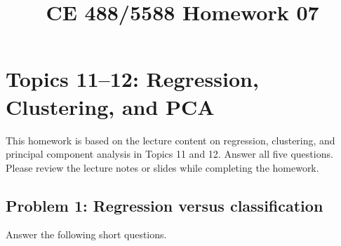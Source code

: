 \documentclass[12pt]{article}
\begin{document}
\title{CE 488/5588 Homework 07\\
\vspace{2in}
\author{}
}
\maketitle
\newpage

\section*{Topics 11--12: Regression, Clustering, and PCA}

\begin{ch-box}
This homework is based on the lecture content on regression, clustering, and principal
component analysis in Topics 11 and 12. Answer all five questions. Please review the lecture notes or slides while completing the homework.
\end{ch-box}


\subsection*{Problem 1: Regression versus classification}
Answer the following short questions.
\end{document}
